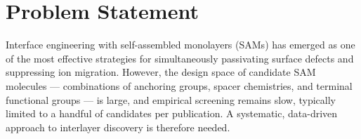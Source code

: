 \section{Problem Statement}

Interface engineering with self-assembled monolayers (SAMs) has emerged as
one of the most effective strategies for simultaneously passivating surface
defects and suppressing ion migration. However, the design space of
candidate SAM molecules --- combinations of anchoring groups, spacer
chemistries, and terminal functional groups --- is large, and empirical
screening remains slow, typically limited to a handful of candidates per
publication. A systematic, data-driven approach to interlayer discovery is
therefore needed.
